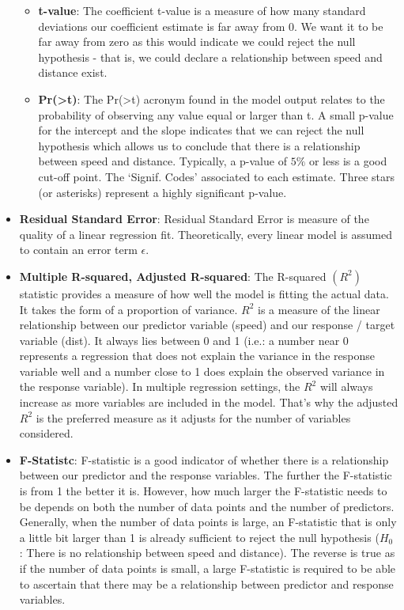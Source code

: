 \documentclass[a4paper]{article}
\begin{document}
\begin{itemize}
\begin{itemize}
        \item[] \textbf{t-value}: The coefficient t-value is a measure of how many standard deviations our coefficient estimate is far away from 0. We want it to be far away from zero as this would indicate we could reject the null hypothesis - that is, we could declare a relationship between speed and distance exist.
        
        \item[] \textbf{Pr(>t)}: The Pr(>t) acronym found in the model output relates to the probability of observing any value equal or larger than t. A small p-value for the intercept and the slope indicates that we can reject the null hypothesis which allows us to conclude that there is a relationship between speed and distance. Typically, a p-value of $5\%$ or less is a good cut-off point. The ‘Signif. Codes’ associated to each estimate. Three stars (or asterisks) represent a highly significant p-value. 
    \end{itemize}
    
    \item[] \textbf{Residual Standard Error}: Residual Standard Error is measure of the quality of a linear regression fit. Theoretically, every linear model is assumed to contain an error term $\epsilon$.
    
    \item[] \textbf{Multiple R-squared, Adjusted R-squared}: The R-squared $(R^{2})$ statistic provides a measure of how well the model is fitting the actual data. It takes the form of a proportion of variance. $R^2$ is a measure of the linear relationship between our predictor variable (speed) and our response / target variable (dist). It always lies between 0 and 1 (i.e.: a number near 0 represents a regression that does not explain the variance in the response variable well and a number close to 1 does explain the observed variance in the response variable). In multiple regression settings, the $R^2$ will always increase as more variables are included in the model. That’s why the adjusted $R^2$ is the preferred measure as it adjusts for the number of variables considered.
    
    \item[] \textbf{F-Statistc}: F-statistic is a good indicator of whether there is a relationship between our predictor and the response variables. The further the F-statistic is from 1 the better it is. However, how much larger the F-statistic needs to be depends on both the number of data points and the number of predictors. Generally, when the number of data points is large, an F-statistic that is only a little bit larger than 1 is already sufficient to reject the null hypothesis ($H_0$ : There is no relationship between speed and distance). The reverse is true as if the number of data points is small, a large F-statistic is required to be able to ascertain that there may be a relationship between predictor and response variables.  
\end{itemize}
\end{document}
